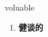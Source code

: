 
\begin{frame}
{\huge voluable}
\begin{center}
\begin{enumerate}\Large
  \item \textbf{健谈的}
\end{enumerate}
\end{center}
\end{frame}

